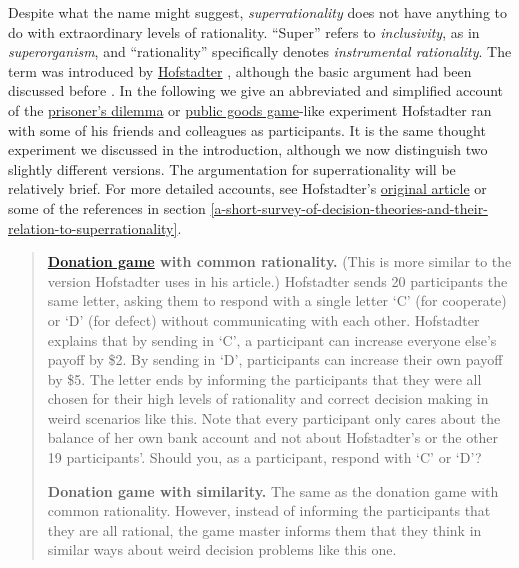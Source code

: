 Despite what the name might suggest, \emph{superrationality} does not
have anything to do with extraordinary levels of rationality. ``Super''
refers to \emph{inclusivity}, as in \emph{superorganism}, and
``rationality'' specifically denotes \emph{instrumental rationality}.
The term was introduced by
\href{https://en.wikipedia.org/wiki/Douglas_Hofstadter}{Hofstadter}
\citeyear{Hofstadter1983-az}, although the basic argument
had been discussed before
\parencite{Davis1977-iw,Horgan1981-hb}. In the following we
give an abbreviated and simplified account of the
\href{https://en.wikipedia.org/wiki/Prisoner\%27s_dilemma}{prisoner's
dilemma} or
\href{https://en.wikipedia.org/wiki/Public_goods_game}{public
goods game}-like experiment Hofstadter ran with some of his friends and
colleagues as participants. It is the same thought experiment we
discussed in the introduction, although we now distinguish two slightly
different versions. The argumentation for superrationality will be
relatively brief. For more detailed accounts, see Hofstadter's
\href{https://www.gwern.net/docs/1985-hofstadter\#dilemmas-for-superrational-thinkers-leading-up-to-a-luring-lottery}{original
article} or some of the references in section
\ref{a-short-survey-of-decision-theories-and-their-relation-to-superrationality}.

\begin{quote}
\textbf{\href{https://en.wikipedia.org/wiki/Prisoner\%27s_dilemma\#Special_case:_Donation_game}{Donation
game} with common rationality.} (This is more similar to the version
Hofstadter uses in his article.) Hofstadter sends 20 participants the
same letter, asking them to respond with a single letter `C' (for
cooperate) or `D' (for defect) without communicating with each other.
Hofstadter explains that by sending in `C', a participant can increase
everyone else's payoff by \$2. By sending in `D', participants can
increase their own payoff by \$5. The letter ends by informing the
participants that they were all chosen for their high levels of
rationality and correct decision making in weird scenarios like this.
Note that every participant only cares about the balance of her own bank
account and not about Hofstadter's or the other 19 participants'. Should
you, as a participant, respond with `C' or `D'?

\textbf{Donation game with similarity.} The same as the donation game
with common rationality. However, instead of informing the participants
that they are all rational, the game master informs them that they think
in similar ways about weird decision problems like this one.
\end{quote}

